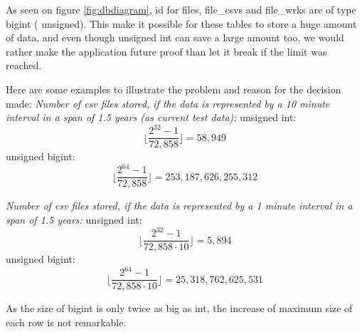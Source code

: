 As seen on figure \ref{fig:dbdiagram}, \textsf{id} for  \textsf{files, file\_csvs} and  \textsf{file\_wrks} are of type \textsf{bigint} ( \textsf{unsigned}). This make it possible for these tables to store a huge amount of data, and even though \textsf{unsigned int} can save a large amount too, we would rather make the application future proof than let it break if the limit was reached.

Here are some examples to illustrate the problem and reason for the decision made:
\textit{Number of csv files stored, if the data is represented by a 10 minute interval in a span of 1.5 years (as current test data):}
\textsf{unsigned int}: 
\begin{equation}
\lfloor \frac{2^{32}-1}{72,858} \rfloor = 58,949
\end{equation}
\textsf{unsigned bigint}:
\begin{equation}
\lfloor \frac{2^{64}-1}{72,858} \rfloor = 253,187,626,255,312
\end{equation}

\textit{Number of csv files stored, if the data is represented by a 1 minute interval in a span of 1.5 years:}
\textsf{unsigned int}:
\begin{equation}
\lfloor \frac{2^{32}-1}{72,858 \cdot 10} \rfloor = 5,894
\end{equation}
\textsf{unsigned bigint}:
\begin{equation}
\lfloor \frac{2^{64}-1}{72,858 \cdot 10} \rfloor = 25,318,762,625,531
\end{equation}

As the size of \textsf{bigint} is only twice as big as \textsf{int}, the increase of maximum size of each row is not remarkable.